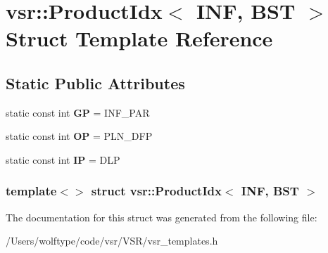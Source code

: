 \hypertarget{structvsr_1_1_product_idx_3_01_i_n_f_00_01_b_s_t_01_4}{\section{vsr\-:\-:Product\-Idx$<$ I\-N\-F, B\-S\-T $>$ Struct Template Reference}
\label{structvsr_1_1_product_idx_3_01_i_n_f_00_01_b_s_t_01_4}
}
\subsection*{Static Public Attributes}
\begin{DoxyCompactItemize}
\item 
\hypertarget{structvsr_1_1_product_idx_3_01_i_n_f_00_01_b_s_t_01_4_a240caa98161d22c9c8fff8b8e1bfee88}{static const int {\bfseries G\-P} = I\-N\-F\-\_\-\-P\-A\-R}\label{structvsr_1_1_product_idx_3_01_i_n_f_00_01_b_s_t_01_4_a240caa98161d22c9c8fff8b8e1bfee88}

\item 
\hypertarget{structvsr_1_1_product_idx_3_01_i_n_f_00_01_b_s_t_01_4_a2ab0f74db7f0bdff4aab62b89275b22a}{static const int {\bfseries O\-P} = P\-L\-N\-\_\-\-D\-F\-P}\label{structvsr_1_1_product_idx_3_01_i_n_f_00_01_b_s_t_01_4_a2ab0f74db7f0bdff4aab62b89275b22a}

\item 
\hypertarget{structvsr_1_1_product_idx_3_01_i_n_f_00_01_b_s_t_01_4_a48f28ce641a6aec2b0e4abb5c1453505}{static const int {\bfseries I\-P} = D\-L\-P}\label{structvsr_1_1_product_idx_3_01_i_n_f_00_01_b_s_t_01_4_a48f28ce641a6aec2b0e4abb5c1453505}

\end{DoxyCompactItemize}
\subsubsection*{template$<$$>$ struct vsr\-::\-Product\-Idx$<$ I\-N\-F, B\-S\-T $>$}



The documentation for this struct was generated from the following file\-:\begin{DoxyCompactItemize}
\item 
/\-Users/wolftype/code/vsr/\-V\-S\-R/vsr\-\_\-templates.\-h\end{DoxyCompactItemize}
